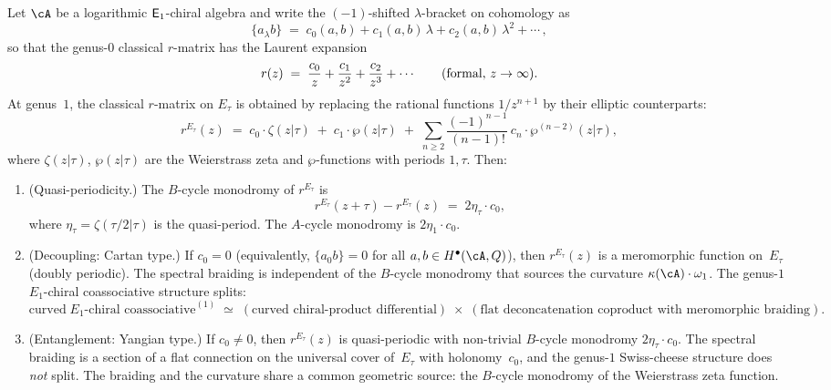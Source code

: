 \begin{theorem}
\label{thm:curvature-braiding-dichotomy}
Let $\cA$ be a logarithmic $\mathsf{E}_1$-chiral algebra and
write the $(-1)$-shifted $\lambda$-bracket on cohomology as
\[
\{a {}_\lambda b\}
\;=\;
c_0(a,b) + c_1(a,b)\,\lambda + c_2(a,b)\,\lambda^2 + \cdots\,,
\]
so that the genus-$0$ classical $r$-matrix has the Laurent
expansion
\[
r(z)
\;=\;
\frac{c_0}{z} + \frac{c_1}{z^2} + \frac{c_2}{z^3} + \cdots
\qquad \text{\textup{(}formal, $z\to\infty$\textup{)}}.
\]
At genus~$1$, the classical $r$-matrix on $E_\tau$ is
obtained by replacing the rational functions $1/z^{n+1}$ by
their elliptic counterparts:
\begin{equation}\label{eq:elliptic-r-matrix}
r^{E_\tau}(z)
\;=\;
c_0\cdot\zeta(z|\tau)
\;+\;
c_1\cdot\wp(z|\tau)
\;+\;
\sum_{n\ge 2}
 \frac{(-1)^{n-1}}{(n-1)!}\,
 c_n\cdot\wp^{(n-2)}(z|\tau),
\end{equation}
where $\zeta(z|\tau)$, $\wp(z|\tau)$ are the Weierstrass
zeta and $\wp$-functions with periods $1,\tau$.
Then:
\begin{enumerate}[label=\textup{(\alph*)}]
\item \textup{(Quasi-periodicity.)}
The $B$-cycle monodromy of $r^{E_\tau}$ is
\begin{equation}\label{eq:r-monodromy}
r^{E_\tau}(z+\tau)-r^{E_\tau}(z)
\;=\;
2\eta_\tau\cdot c_0,
\end{equation}
where $\eta_\tau=\zeta(\tau/2|\tau)$ is the quasi-period.
The $A$-cycle monodromy is $2\eta_1\cdot c_0$.

\item \textup{(Decoupling: Cartan type.)}
If $c_0=0$ \textup{(}equivalently, $\{a{}_0 b\}=0$ for all
$a,b\in H^\bullet(\cA,Q)$\textup{)}, then $r^{E_\tau}(z)$
is a meromorphic function on~$E_\tau$
\textup{(}doubly periodic\textup{)}.
The spectral braiding is independent of the $B$-cycle
monodromy that sources the curvature
$\kappa(\cA)\cdot\omega_1$. The genus-$1$ $E_1$-chiral coassociative
structure splits:
\[
\text{curved}\;E_1\text{-chiral coassociative}^{(1)}
\;\simeq\;
(\text{curved chiral-product differential})
\;\times\;
(\text{flat deconcatenation coproduct with meromorphic braiding}).
\]

\item \textup{(Entanglement: Yangian type.)}
If $c_0\ne 0$, then $r^{E_\tau}(z)$ is quasi-periodic
with non-trivial $B$-cycle monodromy
$2\eta_\tau\cdot c_0$. The spectral braiding is a
section of a flat connection on the universal cover
of~$E_\tau$ with holonomy~$c_0$, and the genus-$1$
Swiss-cheese structure does \emph{not} split.
The braiding and the curvature share a common geometric
source: the $B$-cycle monodromy of the Weierstrass zeta
function.
\end{enumerate}
\end{theorem}

